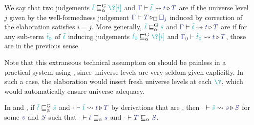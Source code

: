\begin{definition}
  We say that two judgements $\scol{\tilde{t}} \apre \scol{\?[i]}$ and
  $\inferelab{\Gamma}{\tilde{t}}{t}{T}$ are  if the
  universe level $j$ given by the well-formedness judgement
  $\pinferty{\uni}{\tcol{\Gamma}}{\tcol{T}}{\tcol{\uni[j]}}$
  induced by correction of the elaboration satisfies $i = j$.
  More generally, $\scol{\tilde{t}} \apre \scol{\tilde{s}}$ and
  $\inferelab{\Gamma}{\tilde{t}}{t}{T}$ are  if for any
  sub-term $\scol{\tilde{t}_0}$ of $\scol{\tilde{t}}$ inducing judgements $\scol{\tilde{t}_0}
  \apre \scol{\?[i]}$ and $\inferelab{\Gamma_0}{\tilde{t}_0}{t}{T}$,
  those are  in the previous sense.
\end{definition}

Note that this extraneous technical assumption on 
should be painless in a practical system using ,
since universe levels are very seldom given explicitly. In such a case, the elaboration
would insert fresh universe levels at each $\scol{\?}$, which would automatically ensure
universe adequacy.

\begin{theorem}
	\label{thm:static-graduality}

  In  and , if $\scol{\tilde{t}} \apre \scol{\tilde{s}}$ and
  $\inferelab{\emptycon}{\tilde{t}}{t}{T}$ by derivations that are ,
  then $\inferelab{\emptycon}{\tilde{s}}{s}{S}$ for some $\tcol{s}$ and $\tcol{S}$
  such that $\emptycon \vdash \tcol{t} \capre \tcol{s}$
  and $\emptycon \vdash \tcol{T} \capre \tcol{S}$.
\end{theorem}

